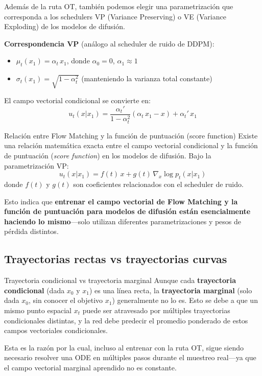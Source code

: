 Además de la ruta OT, también podemos elegir una parametrización que corresponda a los schedulers VP (Variance Preserving) o VE (Variance Exploding) de los modelos de difusión.

\textbf{Correspondencia VP} (análogo al scheduler de ruido de DDPM):
\begin{itemize}
    \item $\mu_t(x_1) = \alpha_t \, x_1$, donde $\alpha_0 = 0$, $\alpha_1 \approx 1$
    \item $\sigma_t(x_1) = \sqrt{1 - \alpha_t^2}$ (manteniendo la varianza total constante)
\end{itemize}

El campo vectorial condicional se convierte en:
$$u_t(x | x_1) = \frac{\alpha_t'}{1 - \alpha_t^2} \left( \alpha_t \, x_1 - x \right) + \alpha_t' \, x_1$$

\begin{knowledgebox}{Relación entre Flow Matching y la función de puntuación (score function)}
Existe una relación matemática exacta entre el campo vectorial condicional y la función de puntuación (\textit{score function}) en los modelos de difusión. Bajo la parametrización VP:
$$u_t(x | x_1) = f(t) \, x + g(t) \, \nabla_x \log p_t(x | x_1)$$
donde $f(t)$ y $g(t)$ son coeficientes relacionados con el scheduler de ruido.

Esto indica que \textbf{entrenar el campo vectorial de Flow Matching y la función de puntuación para modelos de difusión están esencialmente haciendo lo mismo}—solo utilizan diferentes parametrizaciones y pesos de pérdida distintos.
\end{knowledgebox}

\subsection{Trayectorias rectas vs trayectorias curvas}

\begin{warningbox}{Trayectoria condicional vs trayectoria marginal}
Aunque cada \textbf{trayectoria condicional} (dada $x_0$ y $x_1$) es una línea recta, la \textbf{trayectoria marginal} (solo dada $x_0$, sin conocer el objetivo $x_1$) generalmente no lo es. Esto se debe a que un mismo punto espacial $x_t$ puede ser atravesado por múltiples trayectorias condicionales distintas, y la red debe predecir el promedio ponderado de estos campos vectoriales condicionales.

Esta es la razón por la cual, incluso al entrenar con la ruta OT, sigue siendo necesario resolver una ODE en múltiples pasos durante el muestreo real—ya que el campo vectorial marginal aprendido no es constante.
\end{warningbox}

